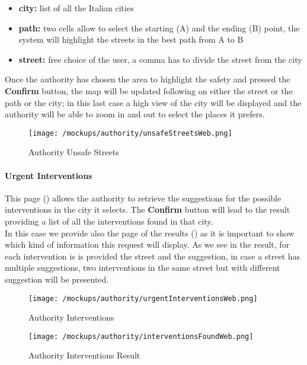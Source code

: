 				\begin{itemize}
					\item \textbf{city:} list of all the Italian cities
					\item \textbf{path:} two cells allow to select the starting (A) and the ending (B) point, the system will highlight the streets in the best path from A to B
					\item \textbf{street:} free choice of the user, a comma has to divide the street from the city
				\end{itemize}
				
				Once the authority has chosen the area to highlight the safety and pressed the \textbf{Confirm} button, the map will be updated following on either the street or the path or the city; in this last case a high view of the city will be displayed and the authority will be able to zoom in and out to select the places it prefers.
				
				\vspace{0.6cm}
					
				\begin{figure}[ht!]
					\centering
					\texttt{[image: /mockups/authority/unsafeStreetsWeb.png]}
					\caption{\label{fig:unsafeStreetsWeb} Authority Unsafe Streets}
				\end{figure}
			
				\paragraph{Urgent Interventions}
				This page () allows the authority to retrieve the suggestions for the possible interventions in the city it selects. The \textbf{Confirm} button will lead to the result providing a list of all the interventions found in that city.\\
				
				In this case we provide also the page of the results () as it is important to show which kind of information this request will display. As we see in the result, for each intervention is is provided the street and the suggestion, in case a street has multiple suggestions, two interventions in the same street but with different suggestion will be presented.
				
				\vspace{0.4cm}				
				
				\begin{figure}[ht!]
					\centering
					\texttt{[image: /mockups/authority/urgentInterventionsWeb.png]}
					\caption{\label{fig:urgentInterventionsWeb} Authority Interventions}
				\end{figure}
			
				\begin{figure}[ht!]
					\centering
					\texttt{[image: /mockups/authority/interventionsFoundWeb.png]}
					\caption{\label{fig:interventionsFoundWeb} Authority Interventions Result}
				\end{figure}